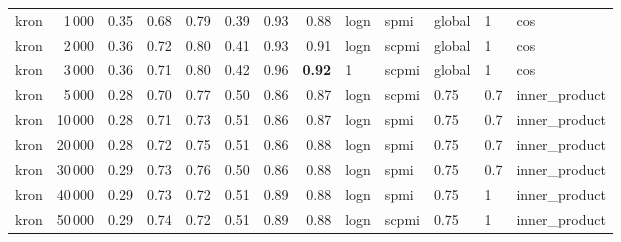 \begin{tabular}{lrrrrrrrlllll}
    kron &            1\,000 &       0.35 &  0.68 &  0.79 &  0.39 &       0.93 &       0.88 &  logn &   spmi &  global &    1 &            cos \\
    kron &            2\,000 &       0.36 &  0.72 &  0.80 &  0.41 &       0.93 &       0.91 &  logn &  scpmi &  global &    1 &            cos \\
    kron &            3\,000 &       0.36 &  0.71 &  0.80 &  0.42 &       0.96 &       \textbf{0.92} &     1 &  scpmi &  global &    1 &            cos \\
    kron &            5\,000 &       0.28 &  0.70 &  0.77 &  0.50 &       0.86 &       0.87 &  logn &  scpmi &    0.75 &  0.7 &  inner\_product \\
    kron &           10\,000 &       0.28 &  0.71 &  0.73 &  0.51 &       0.86 &       0.87 &  logn &   spmi &    0.75 &  0.7 &  inner\_product \\
    kron &           20\,000 &       0.28 &  0.72 &  0.75 &  0.51 &       0.86 &       0.88 &  logn &   spmi &    0.75 &  0.7 &  inner\_product \\
    kron &           30\,000 &       0.29 &  0.73 &  0.76 &  0.50 &       0.86 &       0.88 &  logn &   spmi &    0.75 &  0.7 &  inner\_product \\
    kron &           40\,000 &       0.29 &  0.73 &  0.72 &  0.51 &       0.89 &       0.88 &  logn &   spmi &    0.75 &    1 &  inner\_product \\
    kron &           50\,000 &       0.29 &  0.74 &  0.72 &  0.51 &       0.89 &       0.88 &  logn &  scpmi &    0.75 &    1 &  inner\_product \\
\bottomrule
\end{tabular}
